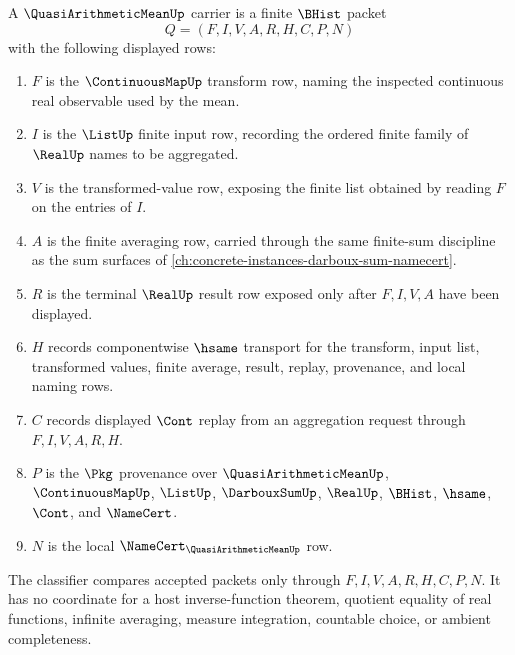 \begin{definition}
\label{def:quasi-arithmetic-mean-carrier}
A $\QuasiArithmeticMeanUp$ carrier is a finite $\BHist$ packet
$$
Q=(F,I,V,A,R,H,C,P,N)
$$
with the following displayed rows:
\begin{enumerate}
\item $F$ is the $\ContinuousMapUp$ transform row, naming the inspected continuous real observable used by the mean.
\item $I$ is the $\ListUp$ finite input row, recording the ordered finite family of $\RealUp$ names to be aggregated.
\item $V$ is the transformed-value row, exposing the finite list obtained by reading $F$ on the entries of $I$.
\item $A$ is the finite averaging row, carried through the same finite-sum discipline as the sum surfaces of \autoref{ch:concrete-instances-darboux-sum-namecert}.
\item $R$ is the terminal $\RealUp$ result row exposed only after $F,I,V,A$ have been displayed.
\item $H$ records componentwise $\hsame$ transport for the transform, input list, transformed values, finite average, result, replay, provenance, and local naming rows.
\item $C$ records displayed $\Cont$ replay from an aggregation request through $F,I,V,A,R,H$.
\item $P$ is the $\Pkg$ provenance over $\QuasiArithmeticMeanUp$, $\ContinuousMapUp$, $\ListUp$, $\DarbouxSumUp$, $\RealUp$, $\BHist$, $\hsame$, $\Cont$, and $\NameCert$.
\item $N$ is the local $\NameCert_{\QuasiArithmeticMeanUp}$ row.
\end{enumerate}
The classifier compares accepted packets only through $F,I,V,A,R,H,C,P,N$. It has no coordinate for a host inverse-function theorem, quotient equality of real functions, infinite averaging, measure integration, countable choice, or ambient completeness.
\end{definition}

